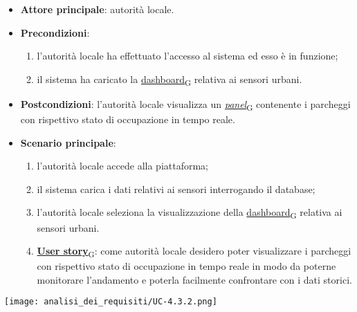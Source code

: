 \begin{itemize}
	\item \textbf{Attore principale}: autorità locale.
	\item \textbf{Precondizioni}:
	      \begin{enumerate}
		      \item l'autorità locale ha effettuato l'accesso al sistema ed esso è in funzione;
		      \item il sistema ha caricato la \href{https://7last.github.io/docs/pb/documentazione-interna/glossario\#dashboard}{dashboard\textsubscript{G}} relativa ai sensori urbani.
	      \end{enumerate}
	\item \textbf{Postcondizioni}: l'autorità locale visualizza un \href{https://7last.github.io/docs/pb/documentazione-interna/glossario\#panel}{\textit{panel}\textsubscript{G}} contenente i parcheggi con rispettivo stato di occupazione in tempo reale.
	\item \textbf{Scenario principale}:
	      \begin{enumerate}
		      \item l'autorità locale accede alla piattaforma;
		      \item il sistema carica i dati relativi ai sensori interrogando il database;
		      \item l'autorità locale seleziona la visualizzazione della \href{https://7last.github.io/docs/pb/documentazione-interna/glossario\#dashboard}{dashboard\textsubscript{G}} relativa ai sensori urbani.
		      \item \href{https://7last.github.io/docs/pb/documentazione-interna/glossario\#user-story}{\textbf{User story}\textsubscript{G}}:
		            come autorità locale desidero poter visualizzare i parcheggi con rispettivo stato di occupazione in tempo reale in modo da poterne monitorare l'andamento
		            e poterla facilmente confrontare con i dati storici.
	      \end{enumerate}
\end{itemize}
\begin{center}
	\texttt{[image: analisi\_dei\_requisiti/UC-4.3.2.png]}
\end{center}

